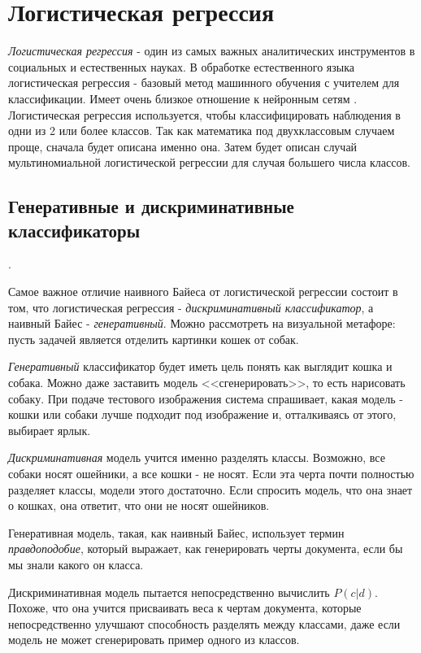 \documentclass[a4paper,12pt,preview]{report} %
\begin{document}
		
	\section{Логистическая регрессия}	
	\textit{Логистическая регрессия} - один из самых важных аналитических инструментов в социальных и естественных науках. В обработке естественного языка логистическая регрессия - базовый метод машинного обучения с учителем для классификации. Имеет очень близкое отношение к нейронным сетям \cite{18}. 
	Логистическая регрессия используется, чтобы классифицировать наблюдения в одни из 2 или более классов. Так как математика под двухклассовым случаем проще, сначала будет описана именно она. Затем будет описан случай мультиномиальной логистической регрессии для случая большего числа классов. 
	
	\subsection{Генеративные и дискриминативные классификаторы}.
	
	Самое важное отличие наивного Байеса от логистической регрессии состоит в том, что логистическая регрессия - \textit{дискриминативный классификатор}, а наивный Байес - \textit{генеративный}. Можно рассмотреть на визуальной метафоре: пусть задачей является отделить картинки кошек от собак. 
	
	\textit{Генеративный} классификатор будет иметь цель понять как выглядит кошка и собака. Можно даже заставить модель <<сгенерировать>>, то есть нарисовать собаку. При подаче тестового изображения система спрашивает, какая модель - кошки или собаки лучше подходит под изображение и, отталкиваясь от этого, выбирает ярлык.
	
	\textit{Дискриминативная} модель учится именно разделять классы. Возможно, все собаки носят ошейники, а все кошки - не носят. Если эта черта почти полностью разделяет классы, модели этого достаточно. Если спросить модель, что она знает о кошках, она ответит, что они не носят ошейников.
	
	Генеративная модель, такая, как наивный Байес, использует термин \textit{правдоподобие}, который выражает, как генерировать черты документа, если бы мы знали какого он класса.
	
	Дискриминативная модель пытается непосредственно вычислить $P(c | d)$. Похоже, что она учится присваивать веса к чертам документа, которые непосредственно улучшают способность разделять между классами, даже если модель не может сгенерировать пример одного из классов.
	
\end{document}
